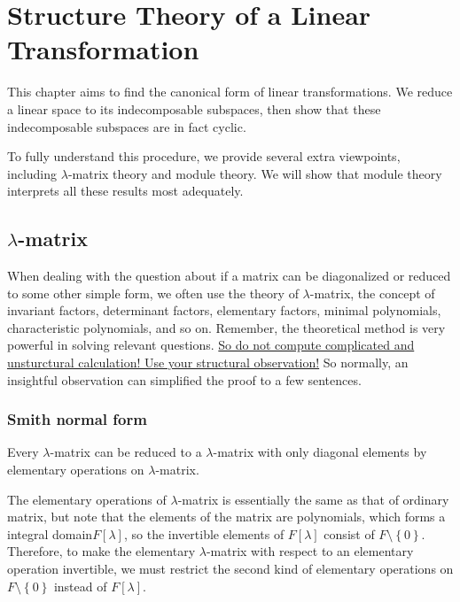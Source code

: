 \chapter{Structure Theory of a Linear Transformation}

This chapter aims to find the canonical form of linear transformations. We reduce a linear space to its indecomposable subspaces, then show that these indecomposable subspaces are in fact cyclic. \par
To fully understand this procedure, we provide several extra viewpoints, including $\lambda$-matrix theory and module theory. We will show that module theory interprets all these results most adequately.
\section{$\lambda$-matrix}
When dealing with the question about if a matrix can be diagonalized or reduced to some other simple form, we often use the theory of $\lambda$-matrix, the concept of invariant factors, determinant factors, elementary factors,  minimal polynomials, characteristic polynomials, and so on. Remember, the theoretical method is very powerful in solving relevant questions. \underline{So do not compute complicated and}
\underline{unsturctural calculation! Use your structural observation!} So normally, an insightful observation can simplified the proof to a few sentences.
\subsection{Smith normal form}
Every $\lambda$-matrix can be reduced to a $\lambda$-matrix with only diagonal elements by elementary operations on $\lambda$-matrix. \par
The elementary operations of $\lambda$-matrix is essentially the same as that of ordinary matrix, but note that the elements of the matrix are polynomials, which forms a integral domain$F[\lambda]$, so the invertible elements of $F[\lambda]$ consist of $F\setminus\left\{0\right\}$. Therefore, to make the elementary $\lambda$-matrix with respect to an elementary operation invertible, we must restrict the second kind of elementary operations on $F\setminus\left\{0\right\}$ instead of $F[\lambda]$.


